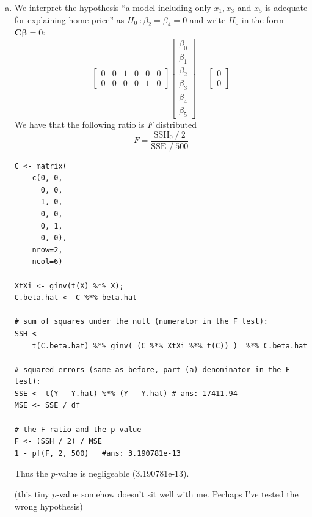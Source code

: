 \documentclass[paper=a4, fontsize=11pt]{scrartcl} %
\newcommand{\vecBeta}{\mathbf{\beta}}
\newcommand{\matC}{\mathbf{C}}
\begin{document}
\begin{enumerate}[(a)]
\item 
We interpret the hypothesis  ``a model including only $ x_1, x_3$ and $x_5$ is 
adequate for explaining home price'' as $H_0 \ : \beta_2 = \beta_4 = 0$ and 
write  $H_0$  in the form $\matC \vecBeta = 0$:  
$$  
\begin{bmatrix} 0 & 0 & 1 & 0 & 0 & 0\\
                             0 & 0 & 0 & 0 & 1 & 0
\end{bmatrix}
\begin{bmatrix} \beta_0\\
                             \beta_1\\
                             \beta_2\\
                             \beta_3\\
                             \beta_4 \\
                             \beta_5
\end{bmatrix}
=
\begin{bmatrix} 0\\
                             0
\end{bmatrix}
$$  
We have that the following ratio is $F$ distributed
$$
F = \frac{\text{SSH}_0 \  / \  2}{ \text{SSE }  / \  500 }
$$

\begin{lstlisting}[basicstyle=\ttfamily\small\bfseries]
C <- matrix( 
    c(0, 0, 
      0, 0, 
      1, 0,
      0, 0, 
      0, 1,
      0, 0),
    nrow=2, 
    ncol=6) 

XtXi <- ginv(t(X) %*% X); 
C.beta.hat <- C %*% beta.hat

# sum of squares under the null (numerator in the F test):
SSH <- 
    t(C.beta.hat) %*% ginv( (C %*% XtXi %*% t(C)) )  %*% C.beta.hat

# squared errors (same as before, part (a) denominator in the F test):
SSE <- t(Y - Y.hat) %*% (Y - Y.hat) # ans: 17411.94
MSE <- SSE / df

# the F-ratio and the p-value
F <- (SSH / 2) / MSE
1 - pf(F, 2, 500)   #ans: 3.190781e-13
\end{lstlisting}

Thus the $p$-value is negligeable (3.190781e-13). 

(this tiny $p$-value somehow doesn't sit well with me. Perhaps I've tested the wrong hypothesis) 

\end{enumerate}
\bigskip
\bigskip
\end{document}

